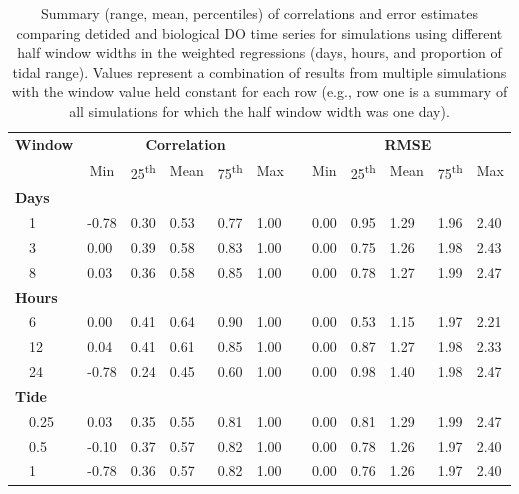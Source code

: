 \documentclass[letterpaper,12pt,oneside]{article}\usepackage[]{graphicx}\usepackage[]{color}
\begin{document}
%
\begin{table}[!tbp]
\caption{Summary (range, mean, percentiles) of correlations and error estimates comparing detided and biological \ac{DO} time series for simulations using different half window widths in the weighted regressions (days, hours, and proportion of tidal range).  Values represent a combination of results from multiple simulations with the window value held constant for each row (e.g., row one is a summary of all simulations for which the half window width was one day).\label{tab:dtd_perf2}} 
\begin{center}
\begin{tabular}{llllllclllll}
\hline\hline
\multicolumn{1}{l}{\bfseries Window}&\multicolumn{5}{c}{\bfseries Correlation}&\multicolumn{1}{c}{\bfseries }&\multicolumn{5}{c}{\bfseries RMSE}\tabularnewline
\cline{2-6} \cline{8-12}
\multicolumn{1}{l}{}&\multicolumn{1}{c}{Min}&\multicolumn{1}{c}{25\textsuperscript{th}}&\multicolumn{1}{c}{Mean}&\multicolumn{1}{c}{75\textsuperscript{th}}&\multicolumn{1}{c}{Max}&\multicolumn{1}{c}{}&\multicolumn{1}{c}{Min}&\multicolumn{1}{c}{25\textsuperscript{th}}&\multicolumn{1}{c}{Mean}&\multicolumn{1}{c}{75\textsuperscript{th}}&\multicolumn{1}{c}{Max}\tabularnewline
\hline
{\bfseries Days}&&&&&&&&&&&\tabularnewline
~~1&-0.78&0.30&0.53&0.77&1.00&&0.00&0.95&1.29&1.96&2.40\tabularnewline
~~3& 0.00&0.39&0.58&0.83&1.00&&0.00&0.75&1.26&1.98&2.43\tabularnewline
~~8& 0.03&0.36&0.58&0.85&1.00&&0.00&0.78&1.27&1.99&2.47\tabularnewline
\hline
{\bfseries Hours}&&&&&&&&&&&\tabularnewline
~~6& 0.00&0.41&0.64&0.90&1.00&&0.00&0.53&1.15&1.97&2.21\tabularnewline
~~12& 0.04&0.41&0.61&0.85&1.00&&0.00&0.87&1.27&1.98&2.33\tabularnewline
~~24&-0.78&0.24&0.45&0.60&1.00&&0.00&0.98&1.40&1.98&2.47\tabularnewline
\hline
{\bfseries Tide}&&&&&&&&&&&\tabularnewline
~~0.25& 0.03&0.35&0.55&0.81&1.00&&0.00&0.81&1.29&1.99&2.47\tabularnewline
~~0.5&-0.10&0.37&0.57&0.82&1.00&&0.00&0.78&1.26&1.97&2.40\tabularnewline
~~1&-0.78&0.36&0.57&0.82&1.00&&0.00&0.76&1.26&1.97&2.40\tabularnewline
\hline
\end{tabular}
\end{center}
\end{table}
\end{document}
